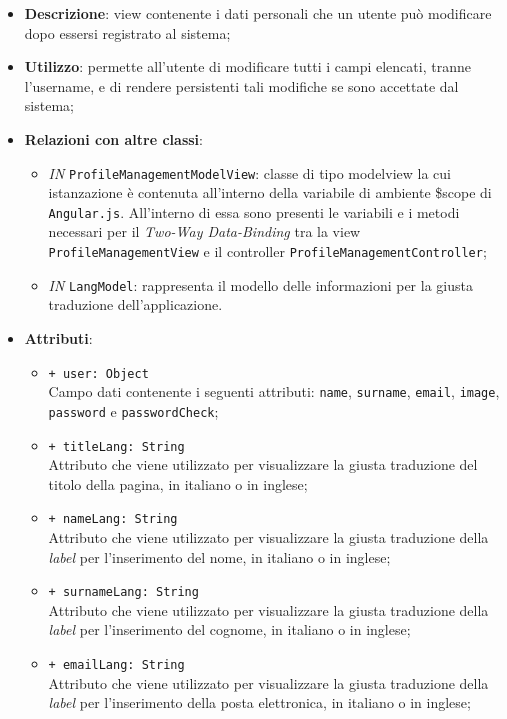 \begin{itemize}
	\item \textbf{Descrizione}: view contenente i dati personali che un utente può modificare dopo essersi registrato al sistema;
	\item \textbf{Utilizzo}: permette all'utente di modificare tutti i campi elencati, tranne l'username, e di rendere persistenti tali modifiche se sono accettate dal sistema;
	\item \textbf{Relazioni con altre classi}:
	\begin{itemize}
		\item \textit{IN} \texttt{ProfileManagementModelView}: classe di tipo modelview la cui istanzazione è contenuta all'interno della variabile di ambiente \$scope di \texttt{Angular.js}. All'interno di essa sono presenti le variabili e i metodi necessari per il \textit{Two-Way Data-Binding} tra la view \texttt{ProfileManagementView} e il controller \texttt{ProfileManagementController};
		\item \textit{IN} \texttt{LangModel}: rappresenta il modello delle informazioni per la giusta traduzione dell'applicazione.
	\end{itemize}
	\item \textbf{Attributi}:
	\begin{itemize}
		\item \texttt{+ user: Object} \\ Campo dati contenente i seguenti attributi: \texttt{name}, \texttt{surname}, \texttt{email}, \texttt{image}, \texttt{password} e \texttt{passwordCheck};
		\item \texttt{+ titleLang: String} \\ Attributo che viene utilizzato per visualizzare la giusta traduzione del titolo della pagina, in italiano o in inglese;
		\item \texttt{+ nameLang: String} \\ Attributo che viene utilizzato per visualizzare la giusta traduzione della \textit{label} per l'inserimento del nome, in italiano o in inglese;
		\item \texttt{+ surnameLang: String} \\ Attributo che viene utilizzato per visualizzare la giusta traduzione della \textit{label} per l'inserimento del cognome, in italiano o in inglese;
		\item \texttt{+ emailLang: String} \\ Attributo che viene utilizzato per visualizzare la giusta traduzione della \textit{label} per l'inserimento della posta elettronica, in italiano o in inglese;

\end{itemize}
\end{itemize}
